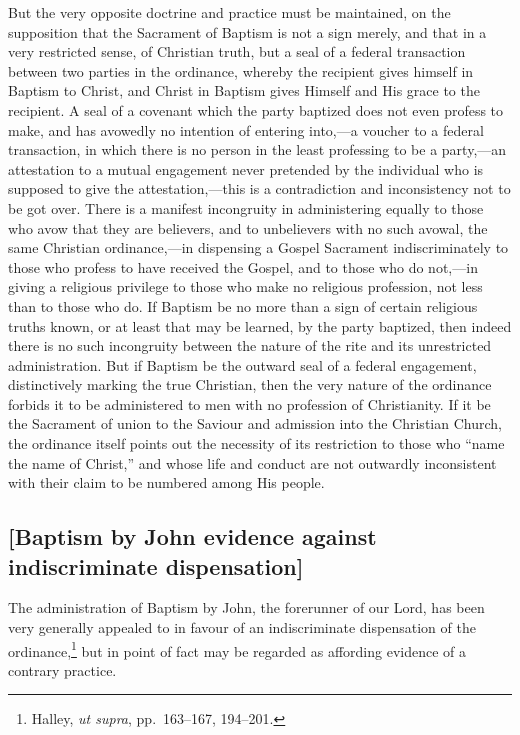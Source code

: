\documentclass[
]{book}
\begin{document}
But the very opposite doctrine and practice must be maintained, on the supposition that the Sacrament of Baptism is not a sign merely, and that in a very restricted sense, of Christian truth, but a seal of a federal transaction between two parties in the ordinance, whereby the recipient gives himself in Baptism to Christ, and Christ in Baptism gives Himself and His grace to the recipient. A seal of a covenant which the party baptized does not even profess to make, and has avowedly no intention of entering into,---a voucher to a federal transaction, in which there is no person in the least professing to be a party,---an attestation to a mutual engagement never pretended by the individual who is supposed to give the attestation,---this is a contradiction and inconsistency not to be got over. There is a manifest incongruity in administering equally to those who avow that they are believers, and to unbelievers with no such avowal, the same Christian ordinance,---in dispensing a Gospel Sacrament indiscriminately to those who profess to have received the Gospel, and to those who do not,---in giving a religious privilege to those who make no religious profession, not less than to those who do. If Baptism be no more than a sign of certain religious truths known, or at least that may be learned, by the party baptized, then indeed there is no such incongruity between the nature of the rite and its unrestricted administration. But if Baptism be the outward seal of a federal engagement, distinctively marking the true Christian, then the very nature of the ordinance forbids it to be administered to men with no profession of Christianity. If it be the Sacrament of union to the Saviour and admission into the Christian Church, the ordinance itself points out the necessity of its restriction to those who ``name the name of Christ,'' and whose life and conduct are not outwardly inconsistent with their claim to be numbered among His people.

\hypertarget{baptism-by-john-evidence-against-indiscriminate-dispensation}{%
\subsection{{[}Baptism by John evidence against indiscriminate dispensation{]}}\label{baptism-by-john-evidence-against-indiscriminate-dispensation}}

The administration of Baptism by John, the forerunner of our Lord, has been very generally appealed to in favour of an indiscriminate dispensation of the ordinance,\footnote{Halley, \emph{ut supra}, pp.~163--167, 194--201.} but in point of fact may be regarded as affording evidence of a contrary practice.
\end{document}
